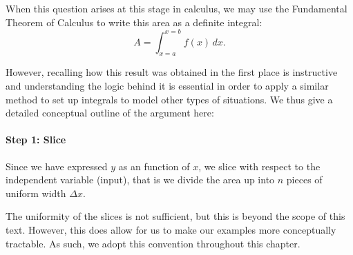 \documentclass{ximera}
\begin{document}
When this question arises at this stage in calculus, we may use the Fundamental Theorem of Calculus to write this area as a definite integral: $$\displaystyle A = \int_{x=a}^{x=b} f(x) \, dx .$$

However, recalling how this result was obtained in the first place is instructive and understanding the logic behind it is essential in order to apply a similar method to set up integrals to model other types of situations.  We thus give a detailed conceptual outline of the argument here:

\paragraph{Step 1: Slice}

Since we have expressed $y$ as an function of $x$, we slice with respect to the independent variable (input), that is we divide the area up into $n$ pieces of uniform width $\Delta x$.


\begin{remark}
The uniformity of the slices is not sufficient, but this is beyond the scope of this text.  However, this does allow for us to make our examples more conceptually tractable.  As such, we adopt this convention throughout this chapter. 
\end{remark}
\end{document}
